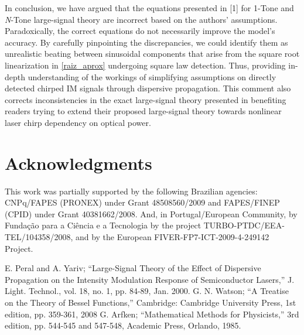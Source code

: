 \documentclass[journal]{IEEEtran}
\begin{document}
In conclusion, we have argued that the equations presented in [1] for 1-Tone and \emph{N}-Tone large-signal theory are incorrect based on the authors' assumptions. Paradoxically, the correct equations do not necessarily improve the model's accuracy. By carefully pinpointing the discrepancies, we could identify them as unrealistic beating between sinusoidal components that arise from the square root linearization in \eqref{raiz_aprox} undergoing square law detection. Thus, providing in-depth understanding of the workings of simplifying assumptions on directly detected chirped IM signals through dispersive propagation. This comment also corrects inconsistencies in the exact large-signal theory presented in \cite{eva} benefiting readers trying to extend their proposed large-signal theory towards nonlinear laser chirp dependency on optical power. 

\section*{Acknowledgments}

This work was partially supported by the following Brazilian agencies: CNPq/FAPES (PRONEX) under Grant 48508560/2009 and FAPES/FINEP (CPID) under Grant 40381662/2008. And, in Portugal/European Community, by Fundação para a Ciência e a Tecnologia by the project TURBO-PTDC/EEA-TEL/104358/2008, and by the European FIVER-FP7-ICT-2009-4-249142 Project. 


\begin{thebibliography}{1}
E. Peral and A. Yariv; ``Large-Signal Theory of the Effect of Dispersive Propagation on the Intensity Modulation Response of Semiconductor Lasers,'' J. Light. Technol., vol. 18, no. 1, pp. 84-89, Jan. 2000.
G. N. Watson; ``A Treatise on the Theory of Bessel Functions,'' Cambridge: Cambridge University Press, 1st edition, pp. 359-361, 2008
G. Arfken; ``Mathematical Methods for Physicists,'' 3rd edition, pp. 544-545 and 547-548, Academic Press, Orlando, 1985.
\end{thebibliography}
\end{document}
